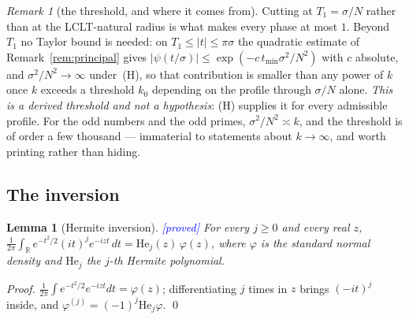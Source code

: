 \documentclass[11pt,a4paper]{article}
\theoremstyle{plain}
\newtheorem{lemma}[theorem]{Lemma}
\theoremstyle{definition}
\theoremstyle{remark}
\newtheorem{remark}[theorem]{Remark}
\newcommand{\STATUS}[1]{\textcolor{blue}{\textsf{[#1]}}}
\begin{document}
\begin{remark}[the threshold, and where it comes from]\label{rem:threshold}
Cutting at $T_1=\sigma/N$ rather than at the LCLT-natural radius is what makes every phase at
most $1$. Beyond $T_1$ no Taylor bound is needed: on $T_1\le|t|\le\pi\sigma$ the quadratic
estimate of Remark~\ref{rem:principal} gives $|\psi(t/\sigma)|\le\exp(-c\,t_{\min}\sigma^{2}/N^{2})$
with $c$ absolute, and $\sigma^{2}/N^{2}\to\infty$ under~\textup{(H)}, so that contribution is
smaller than any power of $k$ once $k$ exceeds a threshold $k_0$ depending on the profile
through $\sigma/N$ alone. \emph{This is a derived threshold and not a hypothesis}: (H) supplies
it for every admissible profile. For the odd numbers and the odd primes,
$\sigma^{2}/N^{2}\asymp k$, and the threshold is of order a few thousand --- immaterial to
statements about $k\to\infty$, and worth printing rather than hiding.
\end{remark}

\subsection{The inversion}\label{app:inv}

\begin{lemma}[Hermite inversion]\label{lem:heinv}
\STATUS{proved}
For every $j\ge0$ and every real $z$,
$\displaystyle\frac1{2\pi}\int_{\mathbb{R}}e^{-t^{2}/2}(it)^{j}e^{-izt}\,dt
 = \mathrm{He}_j(z)\,\varphi(z)$, where $\varphi$ is the standard normal density and
$\mathrm{He}_j$ the $j$-th Hermite polynomial.
\end{lemma}

\begin{proof}
$\frac1{2\pi}\int e^{-t^{2}/2}e^{-izt}dt=\varphi(z)$; differentiating $j$ times in $z$ brings
$(-it)^{j}$ inside, and $\varphi^{(j)}=(-1)^{j}\mathrm{He}_j\varphi$. \qed
\end{proof}
\end{document}
